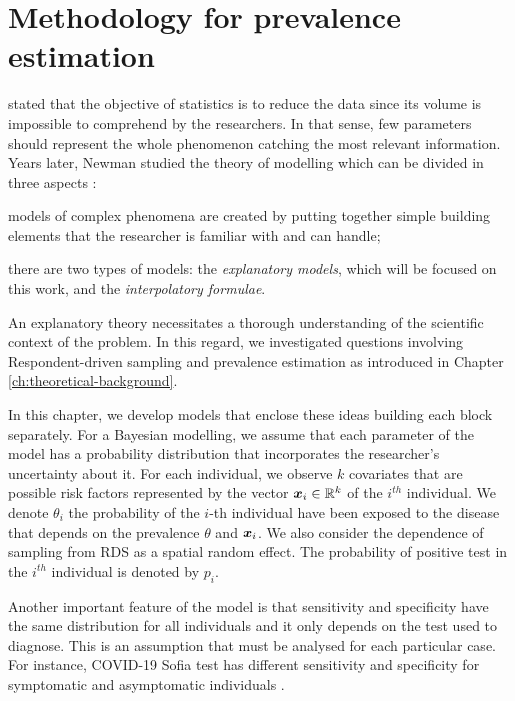 \chapter{Methodology for prevalence estimation}
\label{ch:modelling}

\textcite[p. 311]{fisher1922mathematical} stated that the objective of
statistics is to reduce the data since its volume is impossible
to comprehend by the researchers. In that sense, few parameters should represent the whole phenomenon catching the most relevant information.
Years later, Newman studied the theory of modelling which can be divided
in three aspects \cite[p. 161]{lehmann2012model}:

\begin{alineas}
  \item models of complex phenomena are created by putting together
  simple building elements that the researcher is familiar with and can
  handle;
  \item there are two types of models: the \textit{explanatory models},
  which will be focused on this work, and the \textit{interpolatory formulae}.
  \item An explanatory theory necessitates a thorough understanding of the scientific context of the problem. In this regard, we investigated questions involving Respondent-driven sampling and prevalence estimation as introduced in Chapter \ref{ch:theoretical-background}.
\end{alineas}

In this chapter, we develop models that enclose these ideas building each
block separately. For a Bayesian modelling, we assume that each parameter
of the model has a probability distribution that incorporates the
researcher's uncertainty about it. For each individual, we observe $k$
covariates that are possible risk factors represented by the vector
$\boldsymbol{x}_i \in \mathbb{R}^{k}$ of the $i^{th}$ individual. We denote $\theta_i$ the
probability of the $i$-th individual have been exposed to the disease
that depends on the prevalence $\theta$ and $\boldsymbol{x}_i$. We also consider the
dependence of sampling from RDS as a spatial random effect. The probability of
positive test in the $i^{th}$ individual is denoted by $p_i$.

Another important feature of the model is that sensitivity and
specificity have the same distribution for all individuals and
it only depends on the test used to diagnose. This is an assumption
that must be analysed for each particular case. For instance, COVID-19
Sofia test has different sensitivity and specificity for symptomatic and
asymptomatic individuals \cite[Table 1][p. 3]{mitchell2021performance}.

